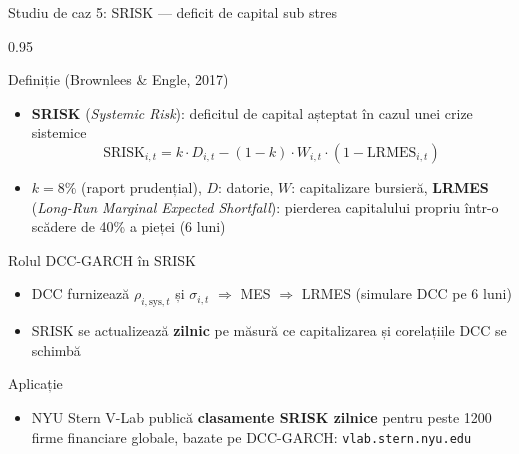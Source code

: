 \documentclass[9pt, aspectratio=169, t]{beamer}
\begin{document}
\begin{frame}{Studiu de caz 5: SRISK --- deficit de capital sub stres}
    \begin{cminipage}{0.95\textwidth}
    \vspace{-2mm}
    {\scriptsize
    \begin{block}{Definiție (Brownlees \& Engle, 2017)}
        \begin{itemize}\setlength{\itemsep}{0pt}
            \item \textbf{SRISK} (\textit{Systemic Risk}): deficitul de capital așteptat în cazul unei crize sistemice
            \vspace{-1mm}
            \[
                \text{SRISK}_{i,t} = k \cdot D_{i,t} - (1-k) \cdot W_{i,t} \cdot (1 - \text{LRMES}_{i,t})
            \]
            \vspace{-4mm}
            \item $k = 8\%$ (raport prudențial), $D$: datorie, $W$: capitalizare bursieră, \textbf{LRMES} (\textit{Long-Run Marginal Expected Shortfall}): pierderea capitalului propriu într-o scădere de 40\% a pieței (6 luni)
        \end{itemize}
    \end{block}
    \vspace{-2mm}
    \begin{block}{Rolul DCC-GARCH în SRISK}
        \begin{itemize}\setlength{\itemsep}{0pt}
            \item DCC furnizează $\rho_{i,\text{sys},t}$ și $\sigma_{i,t}$ $\Rightarrow$ MES $\Rightarrow$ LRMES (simulare DCC pe 6 luni)
            \item SRISK se actualizează \textbf{zilnic} pe măsură ce capitalizarea și corelațiile DCC se schimbă
        \end{itemize}
    \end{block}
    \vspace{-2mm}
    \begin{alertblock}{Aplicație}
        \begin{itemize}\setlength{\itemsep}{0pt}
            \item NYU Stern V-Lab publică \textbf{clasamente SRISK zilnice} pentru peste 1200 firme financiare globale, bazate pe DCC-GARCH: \texttt{vlab.stern.nyu.edu}
        \end{itemize}
    \end{alertblock}
    }
    \end{cminipage}
\end{frame}
\end{document}
